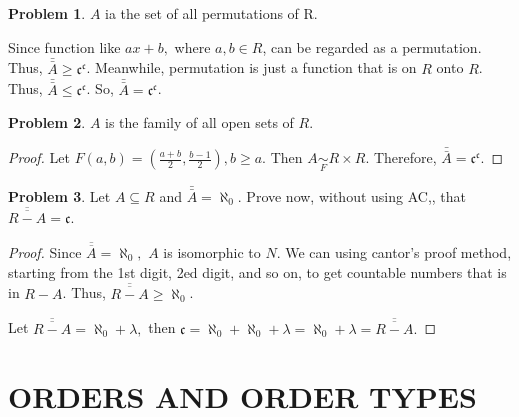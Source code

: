 \documentclass[a4paper,11pt]{article}%
\theoremstyle{remark}
\theoremstyle{definition}
\newtheorem{problem}{Problem}[subsection]
\begin{document}
\begin{problem}
    $A$ ia the set of all permutations of R.

    Since function like $ax+b,$ where $a,b\in R$, can be regarded as a
    permutation. Thus, $\bar{\bar{A}}\geq \mathfrak{c}^{\mathfrak{c}}$.
    Meanwhile, permutation is just a function that is on $R$ onto $R$.
    Thus, $\bar{\bar{A}}\leq \mathfrak{c}^{\mathfrak{c}}$.
    So, $\bar{\bar{A}}=\mathfrak{c}^{\mathfrak{c}}$.
\end{problem}
\begin{problem}
    $A$ is the family of all open sets of $R$.
    \begin{proof}
        Let $F(a,b)=(\frac{a+b}{2},\frac{b-1}{2}),b\geq a.$
        Then $A\underset{F}{\sim}R\times R$.
        Therefore, $\bar{\bar{A}}=\mathfrak{c}^{\mathfrak{c}}$. 
    \end{proof}
\end{problem}
\begin{problem}
    Let $A\subseteq R$ and $\bar{\bar{A}}=\aleph_0$.
    Prove now, without using AC,, that $\overline{\overline{R-A}}=\mathfrak{c}$.
    \begin{proof}
        Since $\overline{\overline{A}}=\aleph_0,$ $A$ is isomorphic to $N$.
        We can using cantor's proof method, starting from the 1st digit, 2ed digit, and so 
        on, to get countable numbers that is in $R-A$. Thus, $\overline{\overline{R-A}}\geq \aleph_0$.

        Let $\overline{\overline{R-A}}=\aleph_0+\lambda,$ then $\mathfrak{c}=\aleph_0+\aleph_0+\lambda=\aleph_0+\lambda=\overline{\overline{R-A}}.$
    \end{proof}
\end{problem}
\section{ORDERS AND ORDER TYPES}
\end{document}
